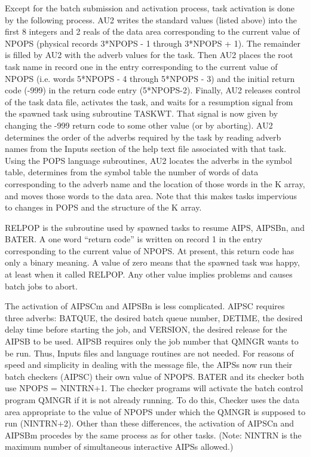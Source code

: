      Except for the batch submission and activation process, task
activation is done by the following process.  AU2 writes the standard
values (listed above) into the first 8 integers and 2 reals of the
data area corresponding to the current value of NPOPS (physical
records 3*NPOPS - 1 through 3*NPOPS + 1).  The remainder is filled by
AU2 with the adverb values for the task.  Then AU2 places the root
task name in record one in the entry corresponding to the current
value of NPOPS (i.e. words 5*NPOPS - 4 through 5*NPOPS - 3) and the
initial return code (-999) in the return code entry (5*NPOPS-2).
Finally, AU2 releases control of the task data file,
activates the task, and waits for a resumption signal from the spawned
task using subroutine TASKWT.  That signal is now given
by changing the -999 return code to some other value (or by aborting).
AU2 determines the order of the adverbs required by the task by
reading adverb names from the Inputs section of the help text file
associated with that task.  Using the POPS language subroutines, AU2
locates the adverbs in the symbol table, determines from the symbol
table the number of words of data corresponding to the adverb name and
the location of those words in the K array, and moves those words to
the data area.  Note that this makes tasks impervious to changes in
POPS and the structure of the K array.

     RELPOP is the subroutine used by spawned tasks to
resume AIPS, AIPSBn, and BATER.  A one word ``return code'' is written
on record 1 in the entry corresponding to the current value of NPOPS.
At present, this return code has only a binary meaning.  A value of
zero means that the spawned task was happy, at least when it called
RELPOP.  Any other value implies problems and causes batch jobs to
abort.

     The activation of AIPSCm and AIPSBn is less complicated.  AIPSC
requires three adverbs: BATQUE, the desired batch queue number,
DETIME, the desired delay time before starting the job, and VERSION,
the desired release for the AIPSB to be used.  AIPSB requires only the
job number that QMNGR wants to be run.  Thus, Inputs
files and language routines are not needed.  For reasons of speed and
simplicity in dealing with the message file, the AIPSs now run their
batch checkers (AIPSC) their own value of NPOPS.  BATER and its
checker both use NPOPS = NINTRN+1.  The checker programs will activate
the batch control program QMNGR if it is not already running.  To do
this, Checker uses the data area appropriate to the value of NPOPS
under which the QMNGR is supposed to run (NINTRN+2).  Other than these
differences, the activation of AIPSCn and AIPSBm procedes by the same
process as for other tasks.  (Note: NINTRN is the maximum number of
simultaneous interactive AIPSs allowed.)


